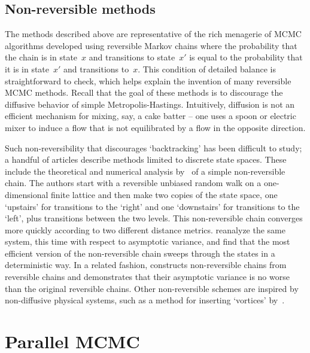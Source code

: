 \documentclass[angelino.tex]{subfiles}
\begin{document}
\subsection{Non-reversible methods}

The methods described above are representative of the rich menagerie of MCMC algorithms 
developed using reversible Markov chains where the probability that the chain
is in state~$x$ and transitions to state~$x'$ is equal to the probability that
it is in state~$x'$ and transitions to~$x$.
This condition of detailed balance is straightforward to check, which helps
explain the invention of many reversible MCMC methods.
Recall that the goal of these methods is to discourage the
diffusive behavior of simple Metropolis-Hastings.
Intuitively, diffusion is not an efficient mechanism for mixing, say, a cake
batter -- one uses a spoon or electric mixer to induce a flow that is not
equilibrated by a flow in the opposite direction.

Such non-reversibility that discourages `backtracking' has been difficult to
study; a handful of articles describe methods limited to discrete state spaces.
These include the theoretical and numerical analysis 
by~\citet{diaconis:2000-non-reversible} of a simple non-reversible chain.
The authors start with a reversible unbiased random walk on a one-dimensional
finite lattice and then make two copies of the state space,
one `upstairs' for transitions to the `right' and
one `downstairs' for transitions to the `left',
plus transitions between the two levels.
This non-reversible chain converges more quickly
according to two different distance metrics.
\citet{geyer:2000-non-reversible} reanalyze the same system, this time with
respect to asymptotic variance, and find that the most efficient version of the 
non-reversible chain sweeps through the states in a deterministic way.
In a related fashion, \citet{neal:2004-non-reversible} constructs non-reversible 
chains from reversible chains and demonstrates that their asymptotic variance is
no worse than the original reversible chains.
Other non-reversible schemes are inspired by non-diffusive physical systems,
such as a method for inserting `vortices' by~\citet{sun:2010-vortices}.


\section{Parallel MCMC}
\end{document}
